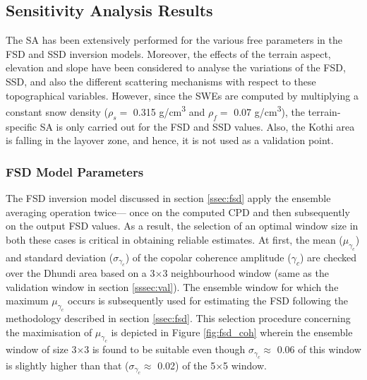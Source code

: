 \documentclass[review]{elsarticle}
\numberwithin{equation}{section}
\numberwithin{figure}{section}
\numberwithin{table}{section}
\begin{document}
\subsection{Sensitivity Analysis Results}
\label{ssec:sar}
The SA has been extensively performed for the various free parameters in the FSD and SSD inversion models. Moreover, the effects of the terrain aspect, elevation and slope have been considered to analyse the variations of the FSD, SSD, and also the different scattering mechanisms with respect to these topographical variables. However, since the SWEs are computed by multiplying a constant snow density ($\rho_s =$ 0.315 g/cm\textsuperscript{3} and $\rho_f =$ 0.07 g/cm\textsuperscript{3}), the terrain-specific SA is only carried out for the FSD and SSD values. Also, the Kothi area is falling in the layover zone, and hence, it is not used as a validation point.

\subsubsection{FSD Model Parameters}
The FSD inversion model discussed in section \ref{ssec:fsd} apply the ensemble averaging operation twice--- once on the computed CPD and then subsequently on the output FSD values. As a result, the selection of an optimal window size in both these cases is critical in obtaining reliable estimates. At first, the mean ($\mu_{\gamma_c}$) and standard deviation ($\sigma_{\gamma_c}$) of the copolar coherence amplitude ($\gamma_c$) are checked over the Dhundi area based on a 3$\times$3 neighbourhood window (same as the validation window in section \ref{sssec:val}). The ensemble window for which the maximum $\mu_{\gamma_c}$ occurs is subsequently used for estimating the FSD following the methodology described in section \ref{ssec:fsd}. This selection procedure concerning the maximisation of $\mu_{\gamma_c}$ is depicted in Figure \ref{fig:fsd_coh} wherein the ensemble window of size 3$\times$3 is found to be suitable even though $\sigma_{\gamma_c} \approx$ 0.06 of this window is slightly higher than that ($\sigma_{\gamma_c} \approx$ 0.02) of the 5$\times$5 window.
\end{document}
